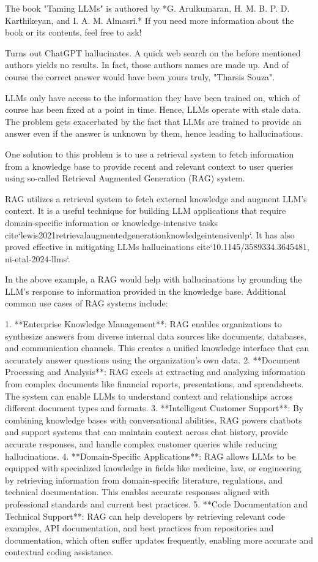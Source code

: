 {{    The book "Taming LLMs" is authored by *G. Arulkumaran, H. M. B. P. D. Karthikeyan, and I. A. M. Almasri.* If you need more information about the book or its contents, feel free to ask!


Turns out ChatGPT hallucinates. A quick web search on the before mentioned authors yields no results. In fact, those authors names are made up. And of course the correct answer would have been yours truly, "Tharsis Souza".

LLMs only have access to the information they have been trained on, which of course has been fixed at a point in time. Hence, LLMs operate with stale data. The problem gets exacerbated by the fact that LLMs are trained to provide an answer even if the answer is unknown by them, hence leading to hallucinations. 

One solution to this problem is to use a retrieval system to fetch information from a knowledge base to provide recent and relevant context to user queries using so-called Retrieval Augmented Generation (RAG) system.

RAG utilizes a retrieval system to fetch external knowledge and augment LLM's context. It is a useful technique for building LLM applications that require domain-specific information or knowledge-intensive tasks {cite}`lewis2021retrievalaugmentedgenerationknowledgeintensivenlp`. It has also proved effective in mitigating LLMs hallucinations {cite}`10.1145/3589334.3645481, ni-etal-2024-llms`.

In the above example, a RAG would help with hallucinations by grounding the LLM's response to information provided in the knowledge base. Additional common use cases of RAG systems include:

1. **Enterprise Knowledge Management**: RAG enables organizations to synthesize answers from diverse internal data sources like documents, databases, and communication channels. This creates a unified knowledge interface that can accurately answer questions using the organization's own data.
2. **Document Processing and Analysis**: RAG excels at extracting and analyzing information from complex documents like financial reports, presentations, and spreadsheets. The system can enable LLMs to understand context and relationships across different document types and formats.
3. **Intelligent Customer Support**: By combining knowledge bases with conversational abilities, RAG powers chatbots and support systems that can maintain context across chat history, provide accurate responses, and handle complex customer queries while reducing hallucinations.
4. **Domain-Specific Applications**: RAG allows LLMs to be equipped with specialized knowledge in fields like medicine, law, or engineering by retrieving information from domain-specific literature, regulations, and technical documentation. This enables accurate responses aligned with professional standards and current best practices.
5. **Code Documentation and Technical Support**: RAG can help developers by retrieving relevant code examples, API documentation, and best practices from repositories and documentation, which often suffer updates frequently, enabling more accurate and contextual coding assistance.

}}
